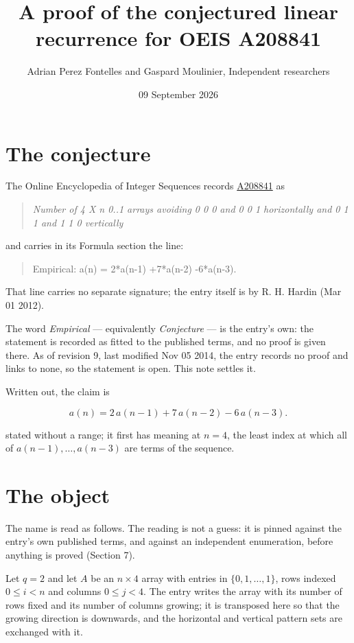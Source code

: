 \documentclass[11pt]{article}
\title{A proof of the conjectured linear recurrence for OEIS A208841}
\author{Adrian Perez Fontelles and Gaspard Moulinier, Independent researchers}
\date{09 September 2026}
\theoremstyle{definition}
\begin{document}
\maketitle
\section{The conjecture}

The Online Encyclopedia of Integer Sequences records \href{https://oeis.org/A208841}{A208841} as

\begin{quote}\itshape Number of 4 X n 0..1 arrays avoiding 0 0 0 and 0 0 1 horizontally and 0 1 1 and 1 1 0 vertically\end{quote}

and carries in its Formula section the line:

\begin{quote}\ttfamily Empirical: a(n) = 2*a(n-1) +7*a(n-2) -6*a(n-3).\end{quote}

That line carries no separate signature; the entry itself is by R. H. Hardin (Mar 01 2012).

The word {\itshape Empirical} --- equivalently {\itshape Conjecture} --- is the entry's own: the statement is recorded as fitted to the published terms, and no proof is given there. As of revision 9, last modified Nov 05 2014, the entry records no proof and links to none, so the statement is open. This note settles it.

Written out, the claim is

\[a(n) = 2\,a(n-1) + 7\,a(n-2) - 6\,a(n-3).\]

stated without a range; it first has meaning at $n = 4$, the least index at which all of $a(n-1),\dots,a(n-3)$ are terms of the sequence.

\section{The object}

The name is read as follows. The reading is not a guess: it is pinned against the entry's own published terms, and against an independent enumeration, before anything is proved (Section 7).

Let $q = 2$ and let $A$ be an $n \times 4$ array with entries in $\{0,1,\dots,1\}$, rows indexed $0 \le i < n$ and columns $0 \le j < 4$. The entry writes the array with its number of rows fixed and its number of columns growing; it is transposed here so that the growing direction is downwards, and the horizontal and vertical pattern sets are exchanged with it.
\end{document}

